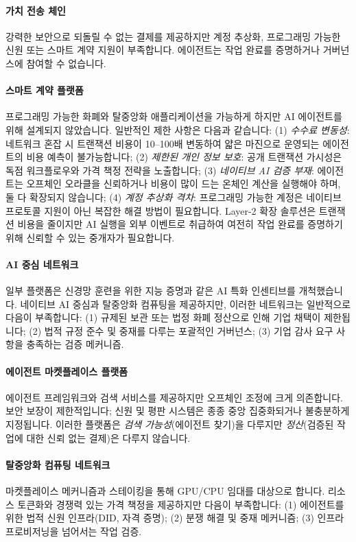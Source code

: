 \documentclass[11pt]{article}
\begin{document}
\paragraph{가치 전송 체인} 강력한 보안으로 되돌릴 수 없는 결제를 제공하지만 계정 추상화, 프로그래밍 가능한 신원 또는 스마트 계약 지원이 부족합니다. 에이전트는 작업 완료를 증명하거나 거버넌스에 참여할 수 없습니다.

\paragraph{스마트 계약 플랫폼} 프로그래밍 가능한 화폐와 탈중앙화 애플리케이션을 가능하게 하지만 AI 에이전트를 위해 설계되지 않았습니다. 일반적인 제한 사항은 다음과 같습니다: (1) \emph{수수료 변동성}: 네트워크 혼잡 시 트랜잭션 비용이 10--100배 변동하여 얇은 마진으로 운영되는 에이전트의 비용 예측이 불가능합니다; (2) \emph{제한된 개인 정보 보호}: 공개 트랜잭션 가시성은 독점 워크플로우와 가격 책정 전략을 노출합니다; (3) \emph{네이티브 AI 검증 부재}: 에이전트는 오프체인 오라클을 신뢰하거나 비용이 많이 드는 온체인 계산을 실행해야 하며, 둘 다 확장되지 않습니다; (4) \emph{계정 추상화 격차}: 프로그래밍 가능한 계정은 네이티브 프로토콜 지원이 아닌 복잡한 해결 방법이 필요합니다. Layer-2 확장 솔루션은 트랜잭션 비용을 줄이지만 AI 실행을 외부 이벤트로 취급하여 여전히 작업 완료를 증명하기 위해 신뢰할 수 있는 중개자가 필요합니다.

\paragraph{AI 중심 네트워크} 일부 플랫폼은 신경망 훈련을 위한 지능 증명과 같은 AI 특화 인센티브를 개척했습니다. 네이티브 AI 중심과 탈중앙화 컴퓨팅을 제공하지만, 이러한 네트워크는 일반적으로 다음이 부족합니다: (1) 규제된 보관 또는 법정 화폐 정산으로 인해 기업 채택이 제한됩니다; (2) 법적 규정 준수 및 중재를 다루는 포괄적인 거버넌스; (3) 기업 감사 요구 사항을 충족하는 검증 메커니즘.

\paragraph{에이전트 마켓플레이스 플랫폼} 에이전트 프레임워크와 검색 서비스를 제공하지만 오프체인 조정에 크게 의존합니다. 보안 보장이 제한적입니다; 신원 및 평판 시스템은 종종 중앙 집중화되거나 불충분하게 지정됩니다. 이러한 플랫폼은 \emph{검색 가능성}(에이전트 찾기)을 다루지만 \emph{정산}(검증된 작업에 대한 신뢰 없는 결제)은 다루지 않습니다.

\paragraph{탈중앙화 컴퓨팅 네트워크} 마켓플레이스 메커니즘과 스테이킹을 통해 GPU/CPU 임대를 대상으로 합니다. 리소스 토큰화와 경쟁력 있는 가격 책정을 제공하지만 다음이 부족합니다: (1) 에이전트를 위한 법적 신원 인프라(DID, 자격 증명); (2) 분쟁 해결 및 중재 메커니즘; (3) 인프라 프로비저닝을 넘어서는 작업 검증.
\end{document}
